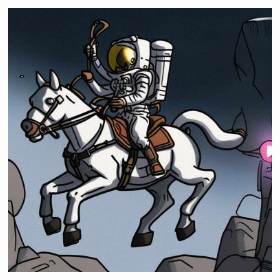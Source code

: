 \documentclass{article}
\begin{document}
\begin{figure}[h]
\begin{subfigure}[t]{\textwidth}
\begin{subfigure}[b]{0.19\textwidth}
         \includegraphics[width=\textwidth]{plots/process/generations/antidb/impress.jpg}
     \end{subfigure}
     \hfill
     \begin{subfigure}[b]{0.19\textwidth}
         \centering


\end{subfigure}
\end{subfigure}
\end{figure}
\end{document}
